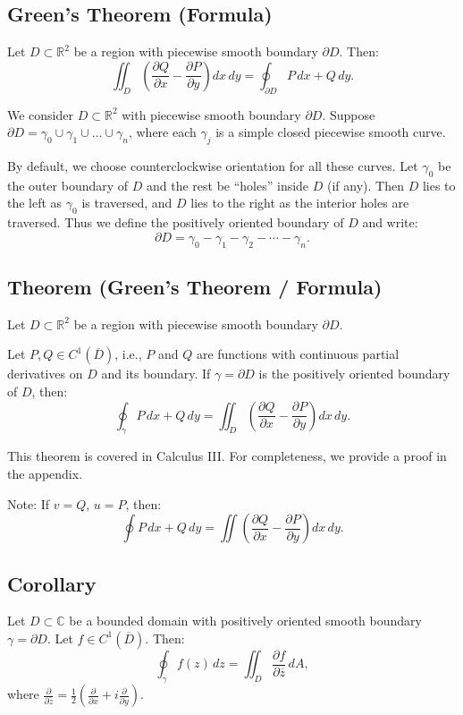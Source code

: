 \documentclass[12pt]{article}
\theoremstyle{definition} %
\theoremstyle{plain} %
\begin{document}
\subsection*{Green’s Theorem (Formula)}

Let $D \subset \mathbb{R}^2$ be a region with piecewise smooth boundary $\partial D$. Then:
\[
\iint_D \left( \frac{\partial Q}{\partial x} - \frac{\partial P}{\partial y} \right) dx\,dy = \oint_{\partial D} P\,dx + Q\,dy.
\]

We consider $D \subset \mathbb{R}^2$ with piecewise smooth boundary $\partial D$. Suppose $\partial D = \gamma_0 \cup \gamma_1 \cup \dots \cup \gamma_n$, where each $\gamma_j$ is a simple closed piecewise smooth curve.

By default, we choose counterclockwise orientation for all these curves. Let $\gamma_0$ be the outer boundary of $D$ and the rest be “holes” inside $D$ (if any). Then $D$ lies to the left as $\gamma_0$ is traversed, and $D$ lies to the right as the interior holes are traversed. Thus we define the positively oriented boundary of $D$ and write:
\[
\partial D = \gamma_0 - \gamma_1 - \gamma_2 - \cdots - \gamma_n.
\]

\subsection*{Theorem (Green’s Theorem / Formula)}

Let $D \subset \mathbb{R}^2$ be a region with piecewise smooth boundary $\partial D$.

Let $P, Q \in C^1(\overline{D})$, i.e., $P$ and $Q$ are functions with continuous partial derivatives on $D$ and its boundary. If $\gamma = \partial D$ is the positively oriented boundary of $D$, then:
\[
\oint_{\gamma} P\,dx + Q\,dy = \iint_D \left( \frac{\partial Q}{\partial x} - \frac{\partial P}{\partial y} \right) dx\,dy.
\]

This theorem is covered in Calculus III. For completeness, we provide a proof in the appendix.

Note: If $v = Q$, $u = P$, then:
\[
\oint P\,dx + Q\,dy = \iint \left( \frac{\partial Q}{\partial x} - \frac{\partial P}{\partial y} \right) dx\,dy.
\]

\subsection*{Corollary}

Let $D \subset \mathbb{C}$ be a bounded domain with positively oriented smooth boundary $\gamma = \partial D$. Let $f \in C^1(\overline{D})$. Then:
\[
\oint_{\gamma} f(z)\,dz = \iint_D \frac{\partial f}{\partial \overline{z}}\,dA,
\]
where $\frac{\partial}{\partial \overline{z}} = \frac{1}{2} \left( \frac{\partial}{\partial x} + i\frac{\partial}{\partial y} \right)$.
\end{document}

